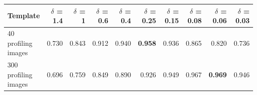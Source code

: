 \begin{tabular}{lrrrrrrrrr}
\hline
Template & $\delta$ = 1.4 & $\delta$ = 1 & $\delta$ = 0.6 & $\delta$ = 0.4 & $\delta$ = 0.25 & $\delta$ = 0.15 & $\delta$ = 0.08 & $\delta$ = 0.06 & $\delta$ = 0.03 \\
\hline
40 profiling images & 0.730 & 0.843 & 0.912 & 0.940 & \textbf{0.958} & 0.936 & 0.865 & 0.820 & 0.736 \\
300 profiling images & 0.696 & 0.759 & 0.849 & 0.890 & 0.926 & 0.949 & 0.967 & \textbf{0.969} & 0.946 \\
\hline
\end{tabular}
